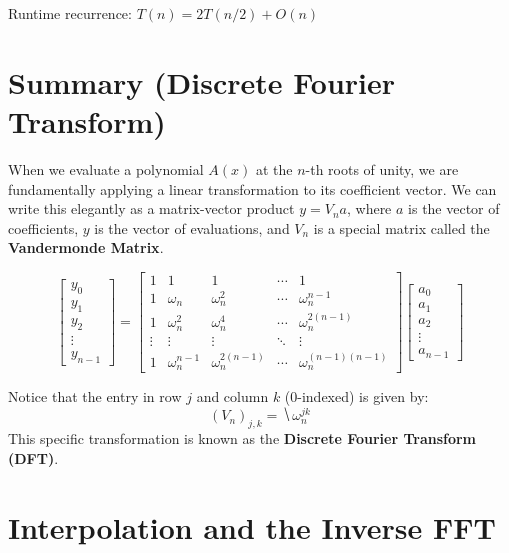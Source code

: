 \documentclass[11  pt]{article}
\begin{document}
\vs{0.3in}

Runtime recurrence: $T(n) = 2T(n/2) + O(n)$


\section{Summary (Discrete Fourier Transform)}

When we evaluate a polynomial $A(x)$ at the $n$-th roots of unity, we are fundamentally applying a linear transformation to its coefficient vector. We can write this elegantly as a matrix-vector product $y = V_n a$, where $a$ is the vector of coefficients, $y$ is the vector of evaluations, and $V_n$ is a special matrix called the \textbf{Vandermonde Matrix}.

\begin{equation*}
    \begin{bmatrix}
        y_0 \\ y_1 \\ y_2 \\ \vdots \\ y_{n-1}
    \end{bmatrix}
    =
    \begin{bmatrix}
        1 & 1 & 1 & \cdots & 1 \\
        1 & \omega_n & \omega_n^2 & \cdots & \omega_n^{n-1} \\
        1 & \omega_n^2 & \omega_n^4 & \cdots & \omega_n^{2(n-1)} \\
        \vdots & \vdots & \vdots & \ddots & \vdots \\
        1 & \omega_n^{n-1} & \omega_n^{2(n-1)} & \cdots & \omega_n^{(n-1)(n-1)}
    \end{bmatrix}
    \begin{bmatrix}
        a_0 \\ a_1 \\ a_2 \\ \vdots \\ a_{n-1}
    \end{bmatrix}
\end{equation*}

Notice that the entry in row $j$ and column $k$ (0-indexed) is given by:
\begin{equation*}
    (V_n)_{j,k} = \hide{\omega_n^{jk}}
\end{equation*}
This specific transformation is known as the \textbf{Discrete Fourier Transform (DFT)}.

\vs{1cm}

\section{Interpolation and the Inverse FFT}
\end{document}
